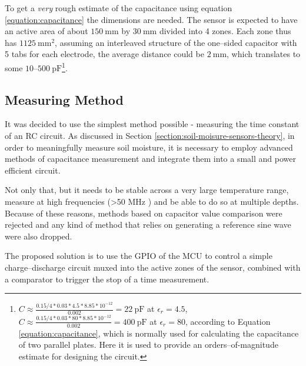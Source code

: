To get a \emph{very} rough estimate of the capacitance using equation \ref{equation:capacitance} the dimensions are needed. The sensor is expected to have an active area of about $150~\mathrm{mm}$ by $30~\mathrm{mm}$ divided into 4 zones. Each zone thus has $1125~\mathrm{mm^2}$, assuming an interleaved structure of the one--sided capacitor with 5 tabs for each electrode, the average distance could be $2~\mathrm{mm}$, which translates to some $10\text{--}500~\mathrm{pF}$\footnote{$C \approx \frac{0.15/4*0.03*4.5*8.85*10^{-12}}{0.002}=22~\mathrm{pF}$ at $\epsilon_r=4.5$, $C \approx \frac{0.15/4*0.03*80*8.85*10^{-12}}{0.002}=400~\mathrm{pF}$ at $\epsilon_r=80$, according to Equation \ref{equation:capacitance}, which is normally used for calculating the capacitance of two parallel plates. Here it is used to provide an orders--of-magnitude estimate for designing the circuit.}.

\subsection{\label{section:measuring-method}Measuring Method}
It was decided to use the simplest method possible - measuring the time constant of an RC circuit. As discussed in Section \ref{section:soil-moisure-sensors-theory}, in order to meaningfully measure soil moisture, it is necessary to employ advanced methods of capacitance measurement and integrate them into a small and power efficient circuit.

Not only that, but it needs to be stable across a very large temperature range, measure at high frequencies (>50 MHz \cite{meter_group_soil_2023}) and be able to do so at multiple depths. Because of these reasons, methods based on capacitor value comparison were rejected and any kind of method that relies on generating a reference sine wave were also dropped.

The proposed solution is to use the GPIO of the MCU to control a simple charge--discharge circuit muxed into the active zones of the sensor, combined with a comparator to trigger the stop of a time measurement.

